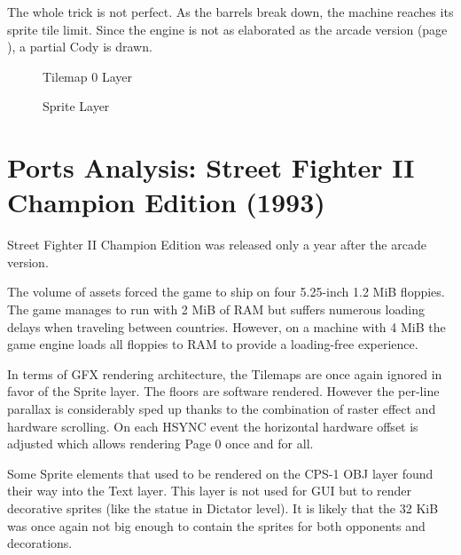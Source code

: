 \vspace{4ex}

The whole trick is not perfect. As the barrels break down, the machine reaches its sprite tile limit. Since the engine is not as elaborated as the arcade version (page \pageref{going_too_far}), a partial Cody is drawn. 

\vspace{-4ex}
\begin{minipage}[t]{0.49\linewidth}
  \begin{figure}[H]
  \caption*{Tilemap 0 Layer}
  \end{figure}
\end{minipage}%
\hfill
\begin{minipage}[t]{0.49\linewidth}
   \begin{figure}[H]
  \caption*{Sprite Layer}
  \end{figure}
\end{minipage}

\pagebreak

\section{Ports Analysis: Street Fighter II Champion Edition (1993)}
Street Fighter II Champion Edition was released only a year after the arcade version.

The volume of assets forced the game to ship on four 5.25-inch 1.2 MiB floppies. The game manages to run with 2 MiB of RAM but suffers numerous loading delays when traveling between countries. However, on a machine with 4 MiB the game engine loads all floppies to RAM to provide a loading-free experience.

In terms of GFX rendering architecture, the Tilemaps are once again ignored in favor of the Sprite layer. The floors are software rendered. However the per-line parallax is considerably sped up thanks to the combination of raster effect and hardware scrolling. On each HSYNC event the horizontal hardware offset is adjusted which allows rendering Page 0 once and for all.

Some Sprite elements that used to be rendered on the CPS-1 OBJ layer found their way into the Text layer. This layer is not used for GUI but to render decorative sprites (like the statue in Dictator level). It is likely that the 32 KiB was once again not big enough to contain the sprites for both opponents and decorations.

